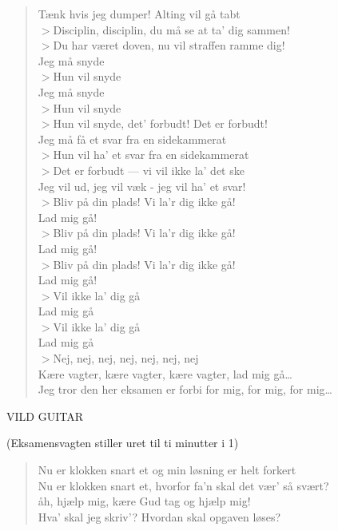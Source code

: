 \documentclass[a4paper,11pt]{article}
\begin{document}
\begin{verse}
Tænk hvis jeg dumper! Alting vil gå tabt\\
$>$Disciplin, disciplin, du må se at ta' dig sammen!\\
$>$Du har været doven, nu vil straffen ramme dig!\\
Jeg må snyde \\
$>$Hun vil snyde\\
Jeg må snyde \\
$>$Hun vil snyde\\
$>$Hun vil snyde, det' forbudt! Det er forbudt!\\
Jeg må få et svar fra en sidekammerat\\
$>$Hun vil ha' et svar fra en sidekammerat\\
$>$Det er forbudt --- vi vil ikke la' det ske\\
Jeg vil ud, jeg vil væk - jeg vil ha' et svar!\\
$>$Bliv på din plads! Vi la'r dig ikke gå! \\
Lad mig gå!\\
$>$Bliv på din plads! Vi la'r dig ikke gå! \\
Lad mig gå!\\
$>$Bliv på din plads! Vi la'r dig ikke gå! \\
Lad mig gå!\\
$>$Vil ikke la' dig gå\\
Lad mig gå\\
$>$Vil ikke la' dig gå \\
Lad mig gå\\
$>$Nej, nej, nej, nej, nej, nej, nej \\
Kære vagter, kære vagter, kære vagter, lad mig gå\dots\\
Jeg tror den her eksamen er forbi for mig, for mig, for mig\dots\\
\end{verse}

VILD GUITAR

(Eksamensvagten stiller uret til ti minutter i 1)

\begin{verse}
Nu er klokken snart et og min løsning er helt forkert\\
Nu er klokken snart et, hvorfor fa'n skal det vær' så svært?\\
åh, hjælp mig, kære Gud tag og hjælp mig!\\
Hva' skal jeg skriv'? Hvordan skal opgaven løses?\\
\end{verse}
\end{document}
